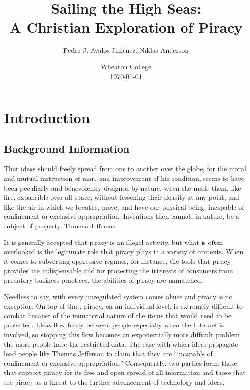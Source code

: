 \documentclass[onecolumn, 12pt]{article}
\title{Sailing the High Seas:\\ A Christian Exploration of Piracy}
\author{Pedro J. Avalos Jim\'enez, Niklas Anderson}
\date{Wheaton College\\\today}
\begin{document}
\maketitle

\section{Introduction}

\subsection{Background Information}

\begin{displayquote}
  \textins That ideas should freely spread from one to another over the globe, for the
    moral and mutual instruction of man, and improvement of his condition, seems to have been
    peculiarly and benevolently designed by nature, when she made them, like fire, expansible
    over all space, without lessening their density at any point, and like the air in which we
    breathe, move, and have our physical being, incapable of confinement or exclusive
    appropriation. Inventions then cannot, in nature, be a subject of property.  Thomas
    Jefferson ~\cite{barlow:wine}
\end{displayquote}
It is generally accepted that piracy is an illegal activity, but what is often overlooked
is the legitimate role that piracy plays in a variety of contexts. When it comes to
subverting oppressive regimes, for instance, the tools that piracy provides are
indispensable and for protecting the interests of consumers from predatory business
practices, the abilities of piracy are unmatched. 

Needless to say, with every unregulated system comes abuse and piracy is no exception.
On top of that, piracy, on an individual level, is extremely difficult to combat because
of the immaterial nature of the items that would need to be protected. Ideas flow freely
between people especially when the Internet is involved, so stopping this flow becomes an
exponentially more difficult problem the more people have the restricted data. The ease
with which ideas propagate lead people like Thomas Jefferson to claim that they are
``incapable of confinement or exclusive appropriation.'' Consequently, two parties form:
those that support piracy for its free and open spread of all information and those that
see piracy as a threat to the further advancement of technology and ideas.
\end{document}
